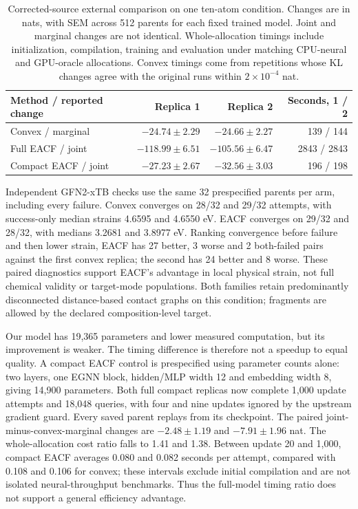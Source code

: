 \begin{table}[t]
\centering
\caption{Corrected-source external comparison on one ten-atom condition.
Changes are in nats, with SEM across 512 parents for each fixed trained model.
Joint and marginal changes are not identical. Whole-allocation timings include
initialization, compilation, training and evaluation under matching CPU-neural
and GPU-oracle allocations. Convex timings come from repetitions whose KL
changes agree with the original runs within $2\times10^{-4}$ nat.}
\label{tab:external-eacf}
\begin{tabular}{lrrr}
\toprule
Method / reported change & Replica 1 & Replica 2 & Seconds, 1 / 2\\
\midrule
Convex / marginal & $-24.74\pm2.29$ & $-24.66\pm2.27$ & 139 / 144\\
Full EACF / joint & $-118.99\pm6.51$ & $-105.56\pm6.47$ & 2843 / 2843\\
Compact EACF / joint & $-27.23\pm2.67$ & $-32.56\pm3.03$ & 196 / 198\\
\bottomrule
\end{tabular}
\end{table}

Independent GFN2-xTB checks use the same 32 prespecified parents per arm,
including every failure. Convex converges on 28/32 and 29/32 attempts, with
success-only median strains 4.6595 and 4.6550 eV. EACF converges on 29/32 and
28/32, with medians 3.2681 and 3.8977 eV. Ranking convergence before failure
and then lower strain, EACF has 27 better, 3 worse and 2 both-failed pairs
against the first convex replica; the second has 24 better and 8 worse.
These paired diagnostics support EACF's advantage in local physical strain,
not full chemical validity or target-mode populations. Both families retain
predominantly disconnected distance-based contact graphs on this condition;
fragments are allowed by the declared composition-level target.

Our model has 19,365 parameters and lower measured computation, but its
improvement is weaker. The timing difference is therefore not a speedup to
equal quality. A compact EACF control is prespecified using parameter counts
alone: two layers, one EGNN block, hidden/MLP width 12 and embedding width 8,
giving 14,900 parameters. Both full compact replicas now complete 1,000 update
attempts and 18,048 queries, with four and nine updates ignored by the upstream
gradient guard. Every saved parent replays from its checkpoint. The paired
joint-minus-convex-marginal changes are $-2.48\pm1.19$ and $-7.91\pm1.96$ nat.
The whole-allocation cost ratio falls to 1.41 and 1.38. Between update 20 and
1,000, compact EACF averages 0.080 and 0.082 seconds per attempt, compared with
0.108 and 0.106 for convex; these intervals exclude initial compilation and
are not isolated neural-throughput benchmarks. Thus the full-model timing
ratio does not support a general efficiency advantage.

